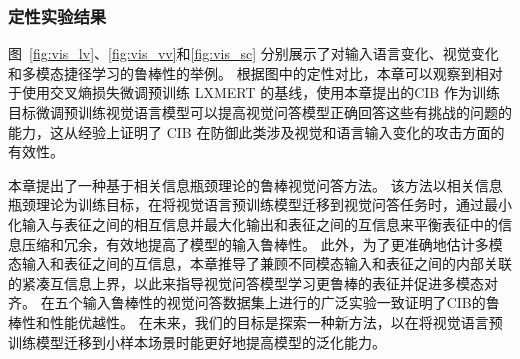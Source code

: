 \subsubsection{定性实验结果}
图~\ref{fig:vis_lv}、\ref{fig:vis_vv}和\ref{fig:vis_sc} 分别展示了对输入语言变化、视觉变化和多模态捷径学习的鲁棒性的举例。
根据图中的定性对比，本章可以观察到相对于使用交叉熵损失微调预训练 LXMERT 的基线，使用本章提出的CIB 作为训练目标微调预训练视觉语言模型可以提高视觉问答模型正确回答这些有挑战的问题的能力，这从经验上证明了 CIB 在防御此类涉及视觉和语言输入变化的攻击方面的有效性。





本章提出了一种基于相关信息瓶颈理论的鲁棒视觉问答方法。
该方法以相关信息瓶颈理论为训练目标，在将视觉语言预训练模型迁移到视觉问答任务时，通过最小化输入与表征之间的相互信息并最大化输出和表征之间的互信息来平衡表征中的信息压缩和冗余，有效地提高了模型的输入鲁棒性。
此外，为了更准确地估计多模态输入和表征之间的互信息，本章推导了兼顾不同模态输入和表征之间的内部关联的紧凑互信息上界，以此来指导视觉问答模型学习更鲁棒的表征并促进多模态对齐。
在五个输入鲁棒性的视觉问答数据集上进行的广泛实验一致证明了CIB的鲁棒性和性能优越性。
在未来，我们的目标是探索一种新方法，以在将视觉语言预训练模型迁移到小样本场景时能更好地提高模型的泛化能力。
